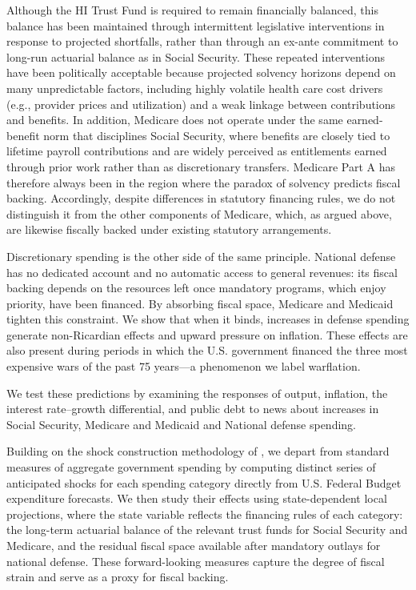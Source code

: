 \documentclass[12pt]{article}%
\theoremstyle{remark}
\begin{document}
Although the HI Trust Fund is required to remain financially balanced, this balance has been maintained through intermittent legislative interventions in response to projected shortfalls, rather than through an ex-ante commitment to long-run actuarial balance as in Social Security. These repeated interventions have been politically acceptable because projected solvency horizons depend on many unpredictable factors, including highly volatile health care cost drivers (e.g., provider prices and utilization) and a weak linkage between contributions and benefits. In addition, Medicare does not operate under the same earned-benefit norm that disciplines Social Security, where benefits are closely tied to lifetime payroll contributions and are widely perceived as entitlements earned through prior work rather than as discretionary transfers.
Medicare Part A has therefore always been in the region where the paradox of solvency predicts fiscal backing. Accordingly, despite differences in statutory financing rules, we do not distinguish it from the other components of Medicare, which, as argued above, are likewise fiscally backed under existing statutory arrangements.

Discretionary spending is the other side of the same principle. National defense has no dedicated account and no automatic access to general revenues: its fiscal backing depends on the resources left once mandatory programs, which enjoy priority, have been financed. By absorbing fiscal space, Medicare and Medicaid tighten this constraint. We show that when it binds, increases in defense spending generate non-Ricardian effects and upward pressure on inflation. These effects are also present during periods in which the U.S. government financed the three most expensive wars of the past 75 years—a phenomenon we label warflation.

We test these predictions by examining the responses of output, inflation, the interest rate–growth differential, and public debt to news about increases in Social Security, Medicare and Medicaid and National defense spending. 

Building on the shock construction methodology of \cite{ForniGambetti2016}, we depart from standard measures of aggregate government spending by computing distinct series of anticipated shocks for each spending category directly from U.S. Federal Budget expenditure forecasts. We then study their effects using state-dependent local projections, where the state variable reflects the financing rules of each category: the long-term actuarial balance of the relevant trust funds for Social Security and Medicare, and the residual fiscal space available after mandatory outlays for national defense. These forward-looking measures capture the degree of fiscal strain and serve as a proxy for fiscal backing.
\end{document}
